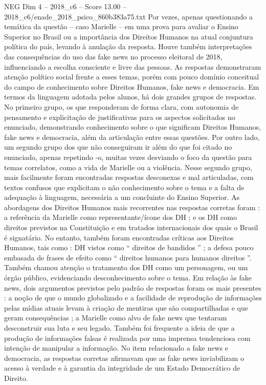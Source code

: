 \begin{textsample}{NEG Dim 4 – 2018\_c6 – Score 13.00 – 2018\_c6/enade\_2018\_psico\_860b383a75.txt}
Por vezes, apenas questionando a temática da questão – caso Marielle – em uma prova para avaliar o Ensino Superior no Brasil ou a importância dos Direitos Humanos na atual conjuntura política do país, levando à anulação da resposta.
Houve também interpretações das consequências do uso das fake news no processo eleitoral de 2018, influenciando a escolha consciente e livre das pessoas.
As respostas demonstraram atenção político social frente a esses temas, porém com pouco domínio conceitual do campo de conhecimento sobre Direitos Humanos, fake news e democracia.
Em termos da linguagem adotada pelos alunos, há dois grandes grupos de respostas.
No primeiro grupo, os que responderam de forma clara, com autonomia de pensamento e explicitação de justificativas para os aspectos solicitados no enunciado, demonstrando conhecimento sobre o que significam Direitos Humanos, fake news e democracia, além da articulação entre essas questões.
Por outro lado, um segundo grupo dos que não conseguiram ir além do que foi citado no enunciado, apenas repetindo -o, muitas vezes desviando o foco da questão para temas correlatos, como a vida de Marielle ou a violência.
Nesse segundo grupo, mais facilmente foram encontradas respostas desconexas e mal articuladas, com textos confusos que explicitam o não conhecimento sobre o tema e a falta de adequação à linguagem, necessária a um concluinte do Ensino Superior.
As abordagens dos Direitos Humanos mais recorrentes nas respostas corretas foram : a referência da Marielle como representante/ícone dos DH ; e os DH como direitos previstos na Constituição e em tratados internacionais dos quais o Brasil é signatário.
No entanto, também foram encontradas críticas aos Direitos Humanos, tais como : DH vistos como “ direitos de bandidos ” ; a defesa pouco embasada de frases de efeito como “ direitos humanos para humanos direitos ”.
Também chamou atenção o tratamento dos DH como um personagem, ou um órgão público, evidenciando desconhecimento sobre o tema.
Em relação às fake news, dois argumentos previstos pelo padrão de respostas foram os mais presentes : a noção de que o mundo globalizado e a facilidade de reprodução de informações pelas mídias atuais levam à criação de mentiras que são compartilhadas e que geram consequências ; a Marielle como alvo de fake news que tentaram desconstruir sua luta e seu legado.
Também foi frequente a ideia de que a produção de informações falsas é realizada por uma imprensa tendenciosa com intenção de manipular a informação.
No item relacionado a fake news e democracia, as respostas corretas afirmavam que as fake news inviabilizam o acesso à verdade e à garantia da integridade de um Estado Democrático de Direito.

\end{textsample}
